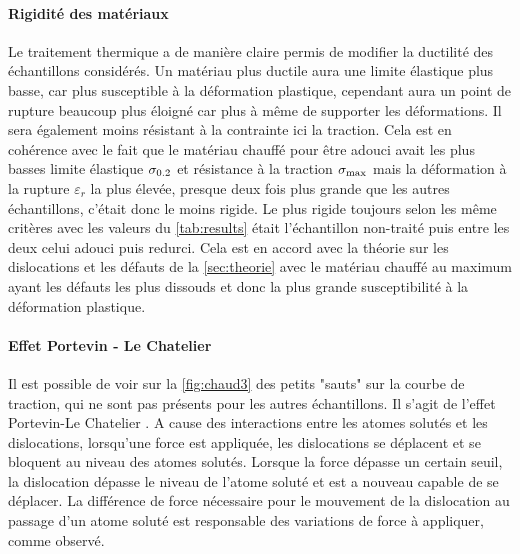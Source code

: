\paragraph{Rigidité des matériaux}
Le traitement thermique a de manière claire permis de modifier la ductilité des échantillons considérés. Un matériau plus ductile aura une limite élastique plus basse, car plus susceptible à la déformation plastique, cependant aura un point de rupture beaucoup plus éloigné car plus à même de supporter les déformations. Il sera également moins résistant à la contrainte ici la traction. Cela est en cohérence avec le fait que le matériau chauffé pour être adouci avait les plus basses limite élastique $\sigma_{0.2}$ et résistance à la traction $\sigma_\mathrm{max}$ mais la déformation à la rupture $\varepsilon_r$ la plus élevée, presque deux fois plus grande que les autres échantillons, c'était donc le moins rigide. Le plus rigide toujours selon les même critères avec les valeurs du \autoref{tab:results} était l'échantillon non-traité puis entre les deux celui adouci puis redurci. Cela est en accord avec la théorie sur les dislocations et les défauts de la \autoref{sec:theorie} avec le matériau chauffé au maximum ayant les défauts les plus dissouds et donc la plus grande susceptibilité à la déformation plastique.

\paragraph{Effet Portevin - Le Chatelier}
Il est possible de voir sur la \autoref{fig:chaud3} des petits "sauts" sur la courbe de traction, qui ne sont pas présents pour les autres échantillons. Il s'agit de l'effet Portevin-Le Chatelier \cite{Yilmaz_2011}. A cause des interactions entre les atomes solutés et les dislocations, lorsqu'une force est appliquée, les dislocations se déplacent et se bloquent au niveau des atomes solutés. Lorsque la force dépasse un certain seuil, la dislocation dépasse le niveau de l'atome soluté et est a nouveau capable de se déplacer. La différence de force nécessaire pour le mouvement de la dislocation au passage d'un atome soluté est responsable des variations de force à appliquer, comme observé.